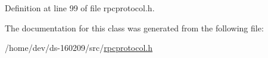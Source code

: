 Definition at line 99 of file rpcprotocol.\+h.



The documentation for this class was generated from the following file\+:\begin{DoxyCompactItemize}
\item 
/home/dev/ds-\/160209/src/\hyperlink{rpcprotocol_8h}{rpcprotocol.\+h}\end{DoxyCompactItemize}
